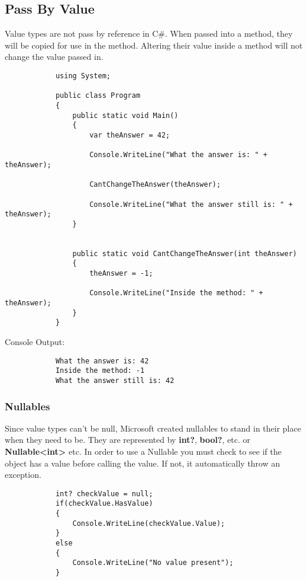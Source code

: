 \documentclass {amsart}
\begin{document}
		\subsection{Pass By Value}  Value types are not pass by reference in C\#. When passed into a method, they will be copied for use in the method.  Altering their value inside a method will not change the value passed in.

		\begin{lstlisting}
			using System;
								
			public class Program
			{
				public static void Main()
				{
					var theAnswer = 42;

					Console.WriteLine("What the answer is: " + theAnswer);
					
					CantChangeTheAnswer(theAnswer);
					
					Console.WriteLine("What the answer still is: " + theAnswer);
				}
				
				
				public static void CantChangeTheAnswer(int theAnswer)
				{
					theAnswer = -1;
					
					Console.WriteLine("Inside the method: " + theAnswer);
				}
			}
		\end{lstlisting}  
		Console Output:
		\begin{verbatim}
			What the answer is: 42
			Inside the method: -1
			What the answer still is: 42
		\end{verbatim}


		\subsubsection{Nullables} Since value types can't be null, Microsoft created nullables to stand in their place when they need to be.  They are represented by {\bf int?}, {\bf bool?}, etc. or {\bf Nullable\textless int\textgreater} \space etc.  In order to use a Nullable you must check to see if the object has a value before calling the value.  If not, it automatically throw an exception.

		\begin{lstlisting}
			int? checkValue = null;
			if(checkValue.HasValue)
			{
				Console.WriteLine(checkValue.Value);
			}
			else
			{
				Console.WriteLine("No value present");
			}
		\end{lstlisting}
\end{document}
